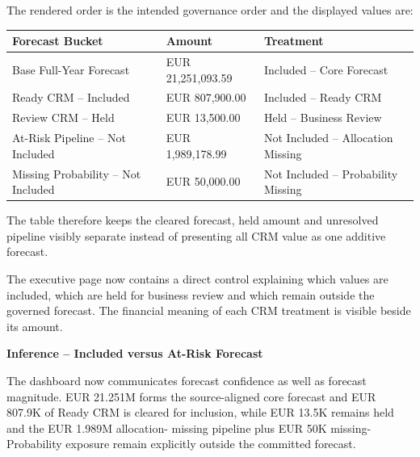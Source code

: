 \documentclass[11pt,a4paper]{article}
\begin{document}
The rendered order is the intended governance order and the displayed values are:

\begin{tabularx}{\textwidth}{
    >{\raggedright\arraybackslash}p{5.3cm}
    >{\raggedleft\arraybackslash}p{3.0cm}
    X
}

\toprule

Forecast Bucket
&
Amount
&
Treatment
\\

\midrule

Base Full-Year Forecast
&
EUR 21,251,093.59
&
Included -- Core Forecast
\\

Ready CRM -- Included
&
EUR 807,900.00
&
Included -- Ready CRM
\\

Review CRM -- Held
&
EUR 13,500.00
&
Held -- Business Review
\\

At-Risk Pipeline -- Not Included
&
EUR 1,989,178.99
&
Not Included -- Allocation Missing
\\

Missing Probability -- Not Included
&
EUR 50,000.00
&
Not Included -- Probability Missing
\\

\bottomrule

\end{tabularx}

The table therefore keeps the cleared forecast, held amount and unresolved pipeline
visibly separate instead of presenting all CRM value as one additive forecast.

\begin{successbox}

\textbf{\color{SuccessGreen}{Forecast Governance Result}}

The executive page now contains a direct control explaining which values are included,
which are held for business review and which remain outside the governed forecast.
The financial meaning of each CRM treatment is visible beside its amount.

\end{successbox}

\begin{inferencebox}

\textbf{Inference -- Included versus At-Risk Forecast}

The dashboard now communicates forecast confidence as well as forecast magnitude.
EUR 21.251M forms the source-aligned core forecast and EUR 807.9K of Ready CRM is
cleared for inclusion, while EUR 13.5K remains held and the EUR 1.989M allocation-
missing pipeline plus EUR 50K missing-Probability exposure remain explicitly outside
the committed forecast.

\end{inferencebox}
\end{document}
